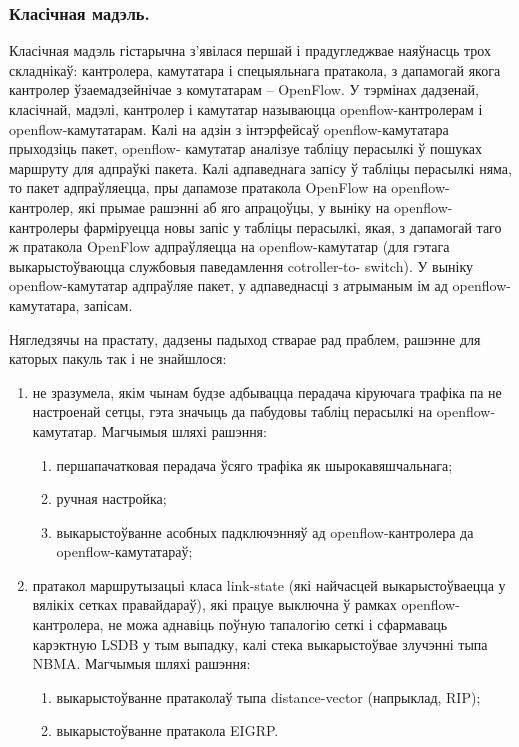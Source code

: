 \subsubsection{Класічная мадэль.}
Класічная мадэль гістарычна з'явілася першай і прадугледжвае наяўнасць трох складнікаў: кантролера, камутатара і спецыяльнага пратакола, з дапамогай якога кантролер ўзаемадзейнічае з комутатарам -- OpenFlow.
У тэрмінах дадзенай, класічнай, мадэлі, кантролер і камутатар
называюцца openflow-кантролерам і openflow-камутатарам.
Калі на адзін з інтэрфейсаў openflow-камутатара прыходзіць пакет, openflow-
камутатар аналізуе табліцу перасылкі ў пошуках маршруту для адпраўкі пакета.
Калі адпаведнага запiсу ў табліцы перасылкі няма, то пакет адпраўляецца, пры дапамозе пратакола OpenFlow на openflow-кантролер, які прымае рашэнні аб
яго апрацоўцы, у выніку на openflow-кантролеры фарміруецца новы запіс у табліцы перасылкі, якая, з дапамогай таго ж пратакола OpenFlow адпраўляецца на
openflow-камутатар (для гэтага выкарыстоўваюцца службовыя паведамлення cotroller-to-
switch). У выніку openflow-камутатар адпраўляе пакет, у адпаведнасці з атрыманым ім ад openflow-камутатара, запісам.

Нягледзячы на прастату, дадзены падыход стварае рад праблем, рашэнне для каторых
пакуль так і не знайшлося:
\begin{enumerate}
    \item не зразумела, якім чынам будзе адбывацца перадача кіруючага трафіка па
    не настроенай сетцы, гэта значыць да пабудовы табліц перасылкі на openflow-камутатар. Магчымыя шляхі рашэння:
    \begin{enumerate}
        \item першапачатковая перадача ўсяго трафіка як шырокавяшчальнага;
        \item ручная настройка;
        \item выкарыстоўванне асобных падключэнняў ад openflow-кантролера да openflow-камутатараў;
    \end{enumerate}
    \item пратакол маршрутызацыі класа link-state (які найчасцей выкарыстоўваецца у вялікіх сетках правайдараў), які працуе выключна ў рамках openflow-кантролера, не можа
    аднавіць поўную тапалогію сеткі і сфармаваць карэктную LSDB у тым выпадку,
    калі стека выкарыстоўвае злучэнні тыпа NBMA. Магчымыя шляхі рашэння:
        \begin{enumerate}
            \item выкарыстоўванне пратаколаў тыпа distance-vector (напрыклад, RIP);
            \item выкарыстоўванне пратакола EIGRP.
        \end{enumerate}
\end{enumerate}

